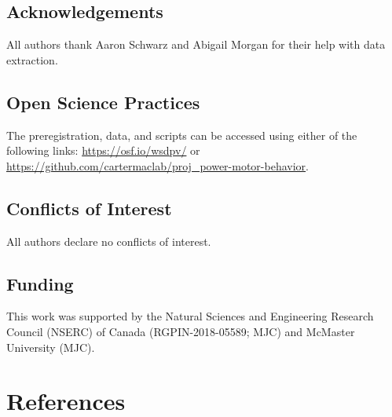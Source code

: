 \documentclass[
  doc, donotrepeattitle,floatsintext]{apa7}
\begin{document}
\hypertarget{acknowledgements}{%
\subsection{Acknowledgements}\label{acknowledgements}}

\noindent All authors thank Aaron Schwarz and Abigail Morgan for their help with data extraction.

\hypertarget{open-science-practices}{%
\subsection{Open Science Practices}\label{open-science-practices}}

\noindent The preregistration, data, and scripts can be accessed using either of the following links: \url{https://osf.io/wsdpv/} or \url{https://github.com/cartermaclab/proj_power-motor-behavior}.

\hypertarget{conflicts-of-interest}{%
\subsection{Conflicts of Interest}\label{conflicts-of-interest}}

\noindent All authors declare no conflicts of interest.

\hypertarget{funding}{%
\subsection{Funding}\label{funding}}

\noindent This work was supported by the Natural Sciences and Engineering Research Council (NSERC) of Canada (RGPIN-2018-05589; MJC) and McMaster University (MJC).

\pagebreak

\hypertarget{references}{%
\section{References}\label{references}}

\vspace{2ex}
\end{document}
